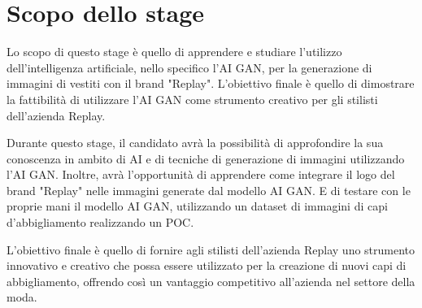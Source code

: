\section*{Scopo dello stage}
Lo scopo di questo stage è quello di apprendere e studiare l'utilizzo dell'intelligenza artificiale,
nello specifico l'AI GAN, per la generazione di immagini di vestiti con il brand "Replay".
L'obiettivo finale è quello di dimostrare la fattibilità di utilizzare
l'AI GAN come strumento creativo per gli stilisti dell'azienda Replay.

Durante questo stage, il candidato avrà la possibilità di approfondire la sua conoscenza in ambito di
AI e di tecniche di generazione di immagini utilizzando l'AI GAN. Inoltre, avrà l'opportunità di apprendere
come integrare il logo del brand "Replay" nelle immagini generate dal modello AI GAN. E di testare con le
proprie mani il modello AI GAN, utilizzando un dataset di immagini di capi d'abbigliamento realizzando un POC.

L'obiettivo finale è quello di fornire agli stilisti dell'azienda Replay uno strumento innovativo
e creativo che possa essere utilizzato per la creazione di nuovi capi di abbigliamento, offrendo così un
vantaggio competitivo all'azienda nel settore della moda.